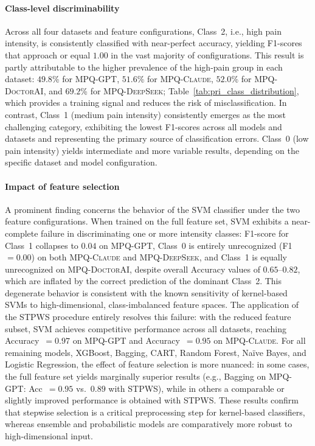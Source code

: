 \documentclass[preprint,12pt,authoryear]{elsarticle}
\newcommand{\dbGPT}{\small\textsc{MPQ-GPT}\xspace}
\newcommand{\dbClaude}{\small\textsc{MPQ-Claude}\xspace}
\newcommand{\dbDeepSeek}{\small\textsc{MPQ-DeepSeek}\xspace}
\newcommand{\dbDoctorAI}{\small\textsc{MPQ-DoctorAI}\xspace}
\begin{document}
\paragraph{Class-level discriminability}
Across all four datasets and feature configurations, Class~2, i.e., high pain intensity, is consistently classified with near-perfect accuracy, yielding F1-scores that approach or equal $1.00$ in the vast majority of configurations. This result is partly attributable to the higher prevalence of the high-pain group in each dataset: $49.8$\% for \dbGPT, $51.6$\% for \dbClaude, $52.0$\% for \dbDoctorAI, and $69.2$\% for \dbDeepSeek; Table~\ref{tab:pri_class_distribution}, which provides a training signal and reduces the risk of misclassification. In contrast, Class~1 (medium pain intensity) consistently emerges as the most challenging category, exhibiting the lowest F1-scores across all models and datasets and representing the primary source of classification errors. Class~0 (low pain intensity) yields intermediate and more variable results, depending on the specific dataset and model configuration.

\paragraph{Impact of feature selection}
A prominent finding concerns the behavior of the SVM classifier under the two feature configurations. When trained on the full feature set, SVM exhibits a near-complete failure in discriminating one or more intensity classes: F1-score for Class~1 collapses to $0.04$ on \dbGPT, Class~0 is entirely unrecognized (F1~$= 0.00$) on both \dbClaude and \dbDeepSeek, and Class~1 is equally unrecognized on \dbDoctorAI, despite overall Accuracy values of $0.65$--$0.82$, which are inflated by the correct prediction of the dominant Class~2. This degenerate behavior is consistent with the known sensitivity of kernel-based SVMs to high-dimensional, class-imbalanced feature spaces. The application of the STPWS procedure entirely resolves this failure: with the reduced feature subset, SVM achieves competitive performance across all datasets, reaching Accuracy~$= 0.97$ on \dbGPT and Accuracy~$= 0.95$ on \dbClaude. For all remaining models, XGBoost, Bagging, CART, Random Forest, Naïve Bayes, and Logistic Regression, the effect of feature selection is more nuanced: in some cases, the full feature set yields marginally superior results (e.g., Bagging on \dbGPT: Acc~$= 0.95$ vs.\ $0.89$ with STPWS), while in others a comparable or slightly improved performance is obtained with STPWS. These results confirm that stepwise selection is a critical preprocessing step for kernel-based classifiers, whereas ensemble and probabilistic models are comparatively more robust to high-dimensional input.
\end{document}
